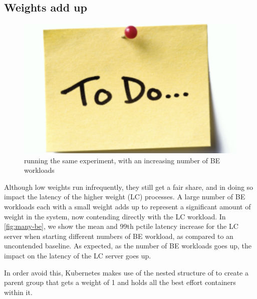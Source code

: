 \subsection{Weights add up}


\begin{figure}[t]
    \centering
    \includegraphics[width=0.8\columnwidth]{graphs/todo.png}
    \caption{running the same experiment, with an increasing number of BE
    workloads}\label{fig:many-be}
\end{figure}


Although low weights run infrequently, they still get a fair share, and in doing
so impact the latency of the higher weight (LC) processes. A large number of BE
workloads each with a small weight adds up to represent a significant amount of
weight in the system, now contending directly with the LC workload. In
\autoref{fig:many-be}, we show the mean and 99th pctile latency increase for the
LC server when starting different numbers of BE workload, as compared to an
uncontended baseline. As expected, as the number of BE workloads goes up, the
impact on the latency of the LC server goes up.

In order avoid this, Kubernetes makes use of the nested structure of \cgroups{}
to create a parent group that gets a weight of 1 and holds all the best effort
containers within it.





